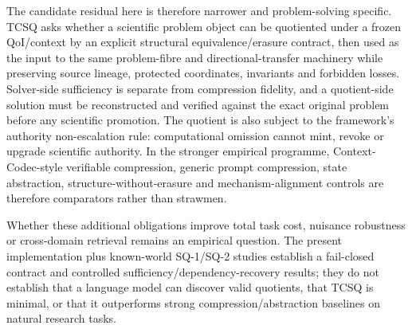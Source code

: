 The candidate residual here is therefore narrower and problem-solving specific. TCSQ asks whether a scientific problem object can be quotiented under a frozen QoI/context by an explicit structural equivalence/erasure contract, then used as the input to the same problem-fibre and directional-transfer machinery while preserving source lineage, protected coordinates, invariants and forbidden losses. Solver-side sufficiency is separate from compression fidelity, and a quotient-side solution must be reconstructed and verified against the exact original problem before any scientific promotion. The quotient is also subject to the framework's authority non-escalation rule: computational omission cannot mint, revoke or upgrade scientific authority. In the stronger empirical programme, Context-Codec-style verifiable compression, generic prompt compression, state abstraction, structure-without-erasure and mechanism-alignment controls are therefore comparators rather than strawmen.

Whether these additional obligations improve total task cost, nuisance robustness or cross-domain retrieval remains an empirical question. The present implementation plus known-world SQ-1/SQ-2 studies establish a fail-closed contract and controlled sufficiency/dependency-recovery results; they do not establish that a language model can discover valid quotients, that TCSQ is minimal, or that it outperforms strong compression/abstraction baselines on natural research tasks.

